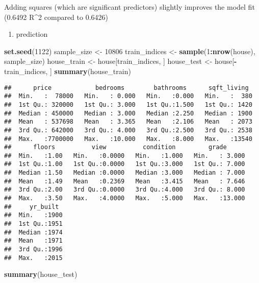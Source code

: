 \documentclass[
]{article}
\newenvironment{Shaded}{\begin{snugshade}}{\end{snugshade}}
\newcommand{\DecValTok}[1]{\textcolor[rgb]{0.00,0.00,0.81}{#1}}
\newcommand{\FunctionTok}[1]{\textcolor[rgb]{0.13,0.29,0.53}{\textbf{#1}}}
\newcommand{\NormalTok}[1]{#1}
\newcommand{\OtherTok}[1]{\textcolor[rgb]{0.56,0.35,0.01}{#1}}
\newcommand{\SpecialCharTok}[1]{\textcolor[rgb]{0.81,0.36,0.00}{\textbf{#1}}}
\providecommand{\tightlist}{%
  \setlength{\itemsep}{0pt}\setlength{\parskip}{0pt}}
\begin{document}
Adding squares (which are significant predictors) slightly improves the
model fit (0.6492 R\^{}2 compared to 0.6426)

\begin{enumerate}
\def\labelenumi{\alph{enumi}.}
\setcounter{enumi}{3}
\tightlist
\item
  prediction
\end{enumerate}

\begin{Shaded}
\begin{Highlighting}[]
\FunctionTok{set.seed}\NormalTok{(}\DecValTok{1122}\NormalTok{)}
\NormalTok{sample\_size }\OtherTok{\textless{}{-}} \DecValTok{10806}
\NormalTok{train\_indices }\OtherTok{\textless{}{-}} \FunctionTok{sample}\NormalTok{(}\DecValTok{1}\SpecialCharTok{:}\FunctionTok{nrow}\NormalTok{(house), sample\_size)}
\NormalTok{house\_train }\OtherTok{\textless{}{-}}\NormalTok{ house[train\_indices, ]}
\NormalTok{house\_test }\OtherTok{\textless{}{-}}\NormalTok{ house[}\SpecialCharTok{{-}}\NormalTok{train\_indices, ]}
\FunctionTok{summary}\NormalTok{(house\_train)}
\end{Highlighting}
\end{Shaded}

\begin{verbatim}
##      price            bedrooms        bathrooms      sqft_living   
##  Min.   :  78000   Min.   : 0.000   Min.   :0.000   Min.   :  380  
##  1st Qu.: 320000   1st Qu.: 3.000   1st Qu.:1.500   1st Qu.: 1420  
##  Median : 450000   Median : 3.000   Median :2.250   Median : 1900  
##  Mean   : 537698   Mean   : 3.365   Mean   :2.106   Mean   : 2073  
##  3rd Qu.: 642000   3rd Qu.: 4.000   3rd Qu.:2.500   3rd Qu.: 2538  
##  Max.   :7700000   Max.   :10.000   Max.   :8.000   Max.   :13540  
##      floors          view          condition         grade       
##  Min.   :1.00   Min.   :0.0000   Min.   :1.000   Min.   : 3.000  
##  1st Qu.:1.00   1st Qu.:0.0000   1st Qu.:3.000   1st Qu.: 7.000  
##  Median :1.50   Median :0.0000   Median :3.000   Median : 7.000  
##  Mean   :1.49   Mean   :0.2369   Mean   :3.415   Mean   : 7.646  
##  3rd Qu.:2.00   3rd Qu.:0.0000   3rd Qu.:4.000   3rd Qu.: 8.000  
##  Max.   :3.50   Max.   :4.0000   Max.   :5.000   Max.   :13.000  
##     yr_built   
##  Min.   :1900  
##  1st Qu.:1951  
##  Median :1974  
##  Mean   :1971  
##  3rd Qu.:1996  
##  Max.   :2015
\end{verbatim}

\begin{Shaded}
\begin{Highlighting}[]
\FunctionTok{summary}\NormalTok{(house\_test)}
\end{Highlighting}
\end{Shaded}
\end{document}
